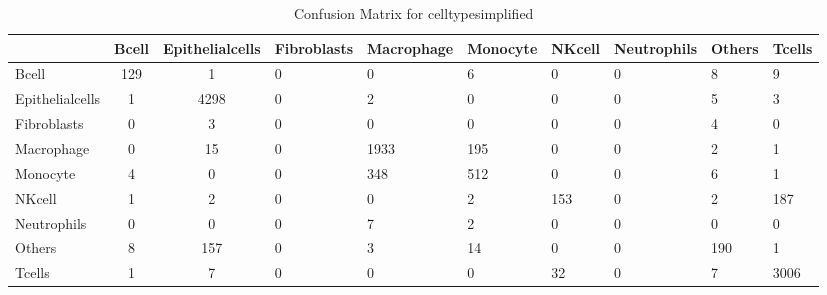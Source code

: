 \begin{table}[htbp]
\centering
\caption{Confusion Matrix for celltypesimplified}
\label{tab:confusionmatrix.celltypesimplified}
\begin{tabular}{|l|cc|}
\toprule
 & Bcell & Epithelialcells & Fibroblasts & Macrophage & Monocyte & NKcell & Neutrophils & Others & Tcells \\
\midrule
Bcell & 129 & 1 & 0 & 0 & 6 & 0 & 0 & 8 & 9 \\
Epithelialcells & 1 & 4298 & 0 & 2 & 0 & 0 & 0 & 5 & 3 \\
Fibroblasts & 0 & 3 & 0 & 0 & 0 & 0 & 0 & 4 & 0 \\
Macrophage & 0 & 15 & 0 & 1933 & 195 & 0 & 0 & 2 & 1 \\
Monocyte & 4 & 0 & 0 & 348 & 512 & 0 & 0 & 6 & 1 \\
NKcell & 1 & 2 & 0 & 0 & 2 & 153 & 0 & 2 & 187 \\
Neutrophils & 0 & 0 & 0 & 7 & 2 & 0 & 0 & 0 & 0 \\
Others & 8 & 157 & 0 & 3 & 14 & 0 & 0 & 190 & 1 \\
Tcells & 1 & 7 & 0 & 0 & 0 & 32 & 0 & 7 & 3006 \\
\bottomrule
\end{tabular}
\end{table}
